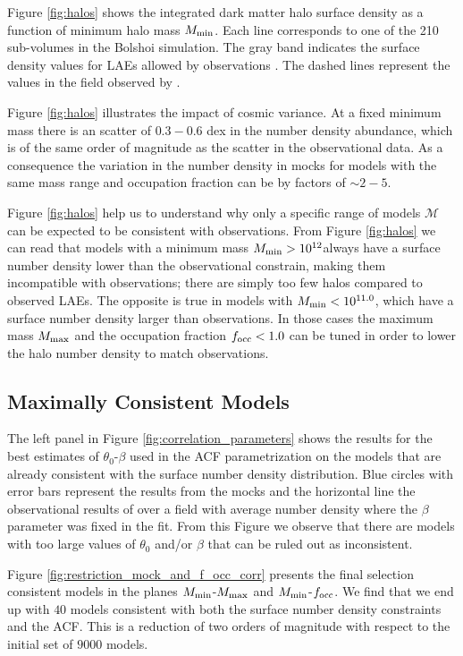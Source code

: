 \documentclass{emulateapj}
\newcommand{\hMsun}{{\ifmmode{h^{-1}{\rm
        {M_{\odot}}}}\else{$h^{-1}{\rm{M_{\odot}}}$}\fi}}
\begin{document}
Figure \ref{fig:halos} shows the  integrated dark matter halo surface
density as a function of  minimum halo mass $M_{\rm min}$. Each line
corresponds to one of the 210 sub-volumes in the Bolshoi
simulation. The gray band indicates the surface density values for
LAEs allowed by observations \citep{Yamada2012}. The dashed lines
represent the values in the field observed by
\citep{Ouchi2008}. 

Figure \ref{fig:halos} illustrates the impact of cosmic variance. At a
fixed minimum mass there is an scatter of $0.3-0.6$ dex in the number
density abundance, which is of the same order of magnitude as the
scatter in the observational data. As a consequence the variation in
the number density in mocks for models with the same mass range and
occupation fraction can be by factors of $\sim 2-5$. 

 
Figure \ref{fig:halos} help us to understand why only a specific range of
models ${\mathcal M}$ can be expected to be consistent with
observations. From Figure \ref{fig:halos} we can read that models with
a minimum mass $M_{\rm min}>10^{12}$\hMsun always have a surface
number density lower than the observational constrain, making them
incompatible with observations; there are simply too few halos
compared to observed LAEs. The opposite is true in models with $M_{\rm
  min}<10^{11.0}$\hMsun, which have a surface number density larger
than observations. In those cases the maximum mass $M_{\rm max}$ and the
occupation fraction $f_{\rm occ}<1.0$  can be tuned in order to lower
the halo number density to match observations.    

\subsection{Maximally Consistent Models}


The left panel in Figure \ref{fig:correlation_parameters} shows the
results for the best estimates of $\theta_{0}$-$\beta$  used in the
ACF parametrization on the models that are already consistent with
the surface number density distribution.  Blue circles with error bars
represent the results from the mocks and the horizontal line the
observational results of \cite{Ouchi2008} over a field with average
number density where the $\beta$ parameter was fixed in the fit. From
this Figure we observe that there are models with too large values of
$\theta_0$ and/or $\beta$ that can be ruled out as inconsistent.

Figure \ref{fig:restriction_mock_and_f_occ_corr} presents the final
selection consistent models in the planes $M_{\rm min}$-$M_{\rm
  max}$ and $M_{\rm   min}$-$f_{\rm occ}$. We find that
we end up with $40$ models consistent with both the surface number
density constraints and the ACF.  This is a reduction of two orders of
magnitude with respect to the initial set of $9000$ models.
\end{document}

